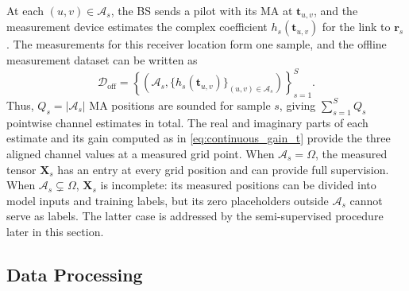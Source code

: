 \documentclass[lettersize,journal]{IEEEtran}
\newcommand{\vect}[1]{\boldsymbol{#1}}
\newcommand{\mat}[1]{\mathbf{#1}}
\begin{document}
At each $(u,v)\in\mathcal{A}_s$, the BS sends a pilot with its MA at $\vect{t}_{u,v}$, and the measurement device estimates the complex coefficient $h_s(\vect{t}_{u,v})$ for the link to $\vect{r}_s$. The measurements for this receiver location form one sample, and the offline measurement dataset can be written as
\begin{equation}
    \mathcal{D}_{\mathrm{off}}=
    \left\{\left(\mathcal{A}_s,
    \{h_s(\vect{t}_{u,v})\}_{(u,v)\in\mathcal{A}_s}\right)\right\}_{s=1}^{S}.
    \label{eq:offline_measurement_set}
\end{equation}
Thus, $Q_s=|\mathcal{A}_s|$ MA positions are sounded for sample $s$, giving $\sum_{s=1}^{S}Q_s$ pointwise channel estimates in total. The real and imaginary parts of each estimate and its gain computed as in \eqref{eq:continuous_gain_t} provide the three aligned channel values at a measured grid point. When $\mathcal{A}_s=\Omega$, the measured tensor $\mat{X}_s$ has an entry at every grid position and can provide full supervision. When $\mathcal{A}_s\subsetneq\Omega$, $\mat{X}_s$ is incomplete: its measured positions can be divided into model inputs and training labels, but its zero placeholders outside $\mathcal{A}_s$ cannot serve as labels. The latter case is addressed by the semi-supervised procedure later in this section.

\subsection{Data Processing}
\end{document}
